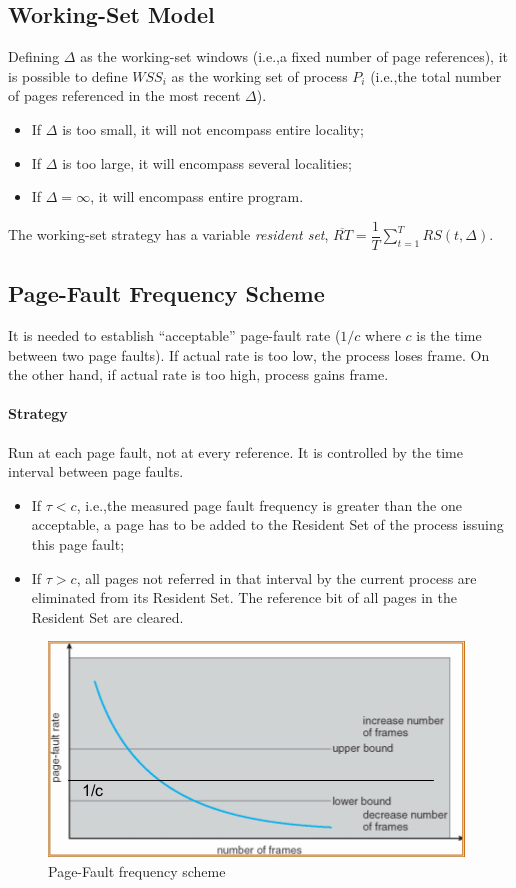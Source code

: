 \subsection{Working-Set Model}
Defining $\Delta$ as the working-set windows (i.e.,\@ a fixed number of page references), it is possible to define ${WSS}_i$ as the working set of process $P_{i}$ (i.e.,\@ the total number of pages referenced in the most recent $\Delta$).
\begin{itemize}
\item If $\Delta$ is too small, it will not encompass entire locality;
\item If $\Delta$ is too large, it will encompass several localities;
\item If $\Delta = \infty$, it will encompass entire program.
\end{itemize}
The working-set strategy has a variable \emph{resident set}, $\overline{RT} = \dfrac{1}{T} \sum_{t=1}^T RS(t,\Delta)$.

\subsection{Page-Fault Frequency Scheme}
It is needed to establish ``acceptable'' page-fault rate ($1/c$ where $c$ is the time between two page faults). If actual rate is too low, the process loses frame. On the other hand, if actual rate is too high, process gains frame.

\paragraph{Strategy}
Run at each page fault, not at every reference. It is controlled by the time interval between page faults.
\begin{itemize}
\item If $\tau < c$, i.e.,\@ the measured page fault frequency is greater than the one acceptable, a page has to be added to the Resident Set of the process issuing this page fault;
\item If $\tau > c$, all pages not referred in that interval by the current process are eliminated from its Resident Set. The reference bit of all pages in the Resident Set are cleared.
\end{itemize}

\begin{figure}[hbtp]
\centering
\includegraphics[scale=0.6]{images/virtual_memory/page_fault_frequency.jpg}
\caption{Page-Fault frequency scheme}
\end{figure}

